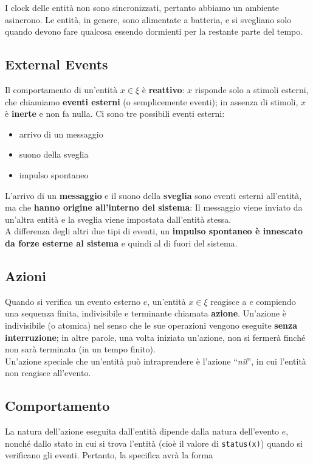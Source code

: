 I clock delle entità non sono sincronizzati, pertanto abbiamo un ambiente
asincrono. Le entità, in genere, sono alimentate a batteria, e si svegliano solo
quando devono fare qualcosa essendo dormienti per la restante parte del tempo.

\subsection{External Events}
Il comportamento di un'entità $x \in \xi$ è \textbf{reattivo}: $x$ risponde solo
a stimoli esterni, che chiamiamo \textbf{eventi esterni} (o semplicemente
eventi); in assenza di stimoli, $x$ è \textbf{inerte} e non fa nulla. Ci sono
tre possibili eventi esterni:

\begin{itemize}
    \item arrivo di un messaggio
    \item suono della sveglia
    \item impulso spontaneo
\end{itemize}

L'arrivo di un \textbf{messaggio} e il suono della \textbf{sveglia} sono eventi
esterni all'entità, ma che \textbf{hanno origine all'interno del sistema}: Il
messaggio viene inviato da un'altra entità e la sveglia viene impostata
dall'entità stessa.\\
A differenza degli altri due tipi di eventi, un \textbf{impulso spontaneo è
    innescato da forze esterne al sistema} e quindi al di fuori del sistema.

\subsection{Azioni}
Quando si verifica un evento esterno $e$, un'entità $x \in \xi$ reagisce a $e$
compiendo una sequenza finita, indivisibile e terminante chiamata
\textbf{azione}. Un'azione è indivisibile (o atomica) nel senso che le sue
operazioni vengono eseguite \textbf{senza interruzione}; in altre parole, una
volta iniziata un'azione, non si fermerà finché non sarà terminata (in un tempo
finito).\\
Un'azione speciale che un'entità può intraprendere è l'azione ``\textit{nil}'', in
cui l'entità non reagisce all'evento.

\subsection{Comportamento}
La natura dell'azione eseguita dall'entità dipende dalla natura dell'evento $e$,
nonché dallo stato in cui si trova l'entità (cioè il valore di \verb|status(x)|)
quando si verificano gli eventi. Pertanto, la specifica avrà la forma

